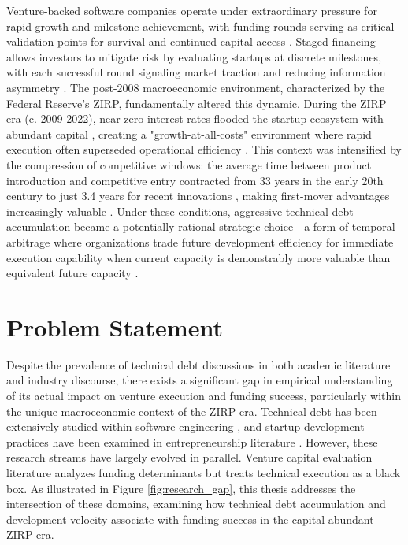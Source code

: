 Venture-backed software companies operate under extraordinary pressure for rapid growth and milestone achievement, with funding rounds serving as critical validation points for survival and continued capital access \citep{sahlman1990structure}. Staged financing allows investors to mitigate risk by evaluating startups at discrete milestones, with each successful round signaling market traction and reducing information asymmetry \citep{levesque2000effects, gompers2001venture}. The post-2008 macroeconomic environment, characterized by the Federal Reserve's \ac{ZIRP}, fundamentally altered this dynamic. During the \ac{ZIRP} era (c. 2009-2022), near-zero interest rates flooded the startup ecosystem with abundant capital \citep{ning2015driving}, creating a "growth-at-all-costs" environment where rapid execution often superseded operational efficiency \citep{kuratko2020blitzscaling}. This context was intensified by the compression of competitive windows: the average time between product introduction and competitive entry contracted from 33 years in the early 20th century to just 3.4 years for recent innovations \citep{agarwal2001first}, making first-mover advantages increasingly valuable \citep{lieberman1998first}. Under these conditions, aggressive technical debt accumulation became a potentially rational strategic choice—a form of temporal arbitrage where organizations trade future development efficiency for immediate execution capability when current capacity is demonstrably more valuable than equivalent future capacity \citep{besker2018embracing}.

\section{Problem Statement}\label{sec:problem}

Despite the prevalence of technical debt discussions in both academic literature and industry discourse, there exists a significant gap in empirical understanding of its actual impact on venture execution and funding success, particularly within the unique macroeconomic context of the \ac{ZIRP} era. Technical debt has been extensively studied within software engineering \citep{li2015systematic}, and startup development practices have been examined in entrepreneurship literature \citep{klotins2019software, nguyen2021entrepreneurial, besker2018embracing}. However, these research streams have largely evolved in parallel. Venture capital evaluation literature analyzes funding determinants \citep{gompers2001venture, lee2024startups} but treats technical execution as a black box. As illustrated in Figure \ref{fig:research_gap}, this thesis addresses the intersection of these domains, examining how technical debt accumulation and development velocity associate with funding success in the capital-abundant \ac{ZIRP} era.

